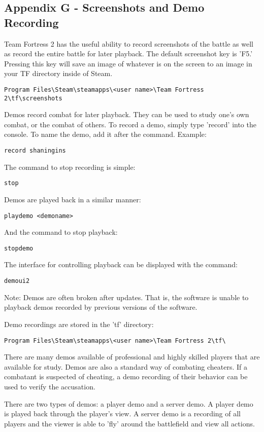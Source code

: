 \subsection{Appendix G - Screenshots and Demo Recording}

Team Fortress 2 has the useful ability to record screenshots of the battle as well as record the entire battle for later playback.  The default screenshot key is 'F5.'  Pressing this key will save an image of whatever is on the screen to an image in your TF directory inside of Steam.
\begin{lstlisting}
Program Files\Steam\steamapps\<user name>\Team Fortress 2\tf\screenshots
\end{lstlisting}
Demos record combat for later playback.  They can be used to study one's own combat, or the combat of others.  To record a demo, simply type 'record' into the console.  To name the demo, add it after the command.  Example:
\begin{lstlisting}
record shaningins
\end{lstlisting}
The command to stop recording is simple:
\begin{lstlisting}
stop
\end{lstlisting}
Demos are played back in a similar manner:
\begin{lstlisting}
playdemo <demoname>
\end{lstlisting}
And the command to stop playback:
\begin{lstlisting}
stopdemo
\end{lstlisting}

The interface for controlling playback can be displayed with the command:
\begin{lstlisting}
demoui2
\end{lstlisting}

Note:  Demos are often broken after updates.  That is, the software is unable to playback demos recorded by previous versions of the software.

Demo recordings are stored in the 'tf' directory:
\begin{lstlisting}
Program Files\Steam\steamapps\<user name>\Team Fortress 2\tf\
\end{lstlisting}

There are many demos available of professional and highly skilled players that are available for study.  Demos are also a standard way of combating cheaters.  If a combatant is suspected of cheating, a demo recording of their behavior can be used to verify the accusation.

There are two types of demos: a player demo and a server demo.  A player demo is played back through the player's view.  A server demo is a recording of all players and the viewer is able to 'fly' around the battlefield and view all actions.